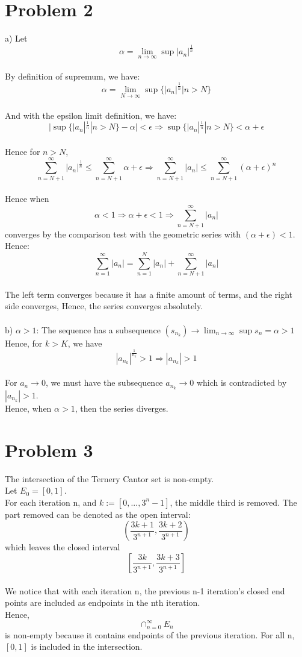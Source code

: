 \documentclass{article}
\begin{document}
\section*{Problem 2}
a) Let $$\alpha = \lim_{n \to \infty} \sup|a_n|^\frac{1}{n}$$
\\By definition of supremum, we have:$$\alpha = \lim_{N \to \infty} \sup\{|a_n|^\frac{1}{n} | n > N\}$$
\\And with the epsilon limit definition, we have: $$|\sup\{|a_n|^\frac{1}{n}|n > N \} - \alpha| < \epsilon \Rightarrow \sup\{|a_n|^\frac{1}{n}| n > N \} < \alpha + \epsilon$$
\\Hence for $n > N$, $$\sum_{n=N+1}^{\infty} |a_n|^\frac{1}{n} \leq \sum_{n=N+1}^{\infty} \alpha + \epsilon \Rightarrow \sum_{n=N+1}^{\infty} |a_n| \leq \sum_{n=N+1}^{\infty} (\alpha + \epsilon)^n$$
\\Hence when $$\alpha < 1 \Rightarrow \alpha + \epsilon < 1 \Rightarrow \sum_{n=N+1}^\infty |a_n|$$ converges by the comparison test with the geometric series with $(\alpha + \epsilon) < 1$.
\\Hence: $$\sum_{n=1}^{\infty} |a_n| = \sum_{n=1}^{N} |a_n| + \sum_{n=N+1}^{\infty} |a_n|$$
\\The left term converges because it has a finite amount of terms, and the right side converges, Hence, the series converges absolutely.
\\
\\b) $\alpha > 1$: The sequence has a subsequence $(s_{n_k}) \to \lim_{n \to \infty} \sup s_n = \alpha > 1$
\\Hence, for $k > K$, we have $$|a_{n_k}|^\frac{1}{n_k} > 1 \Rightarrow |a_{n_k}| > 1$$
\\For $a_n \to 0$, we must have the subsequence $a_{n_k} \to 0$ which is contradicted by $|a_{n_k}| > 1$.
\\Hence, when $\alpha > 1$, then the series diverges.

\section*{Problem 3}
 The intersection of the Ternery Cantor set is non-empty.
 \\Let $E_0 = [0, 1]$.
 \\For each iteration n, and $k := [0, ... ,3^n - 1] $, the middle third is removed. The part removed can be denoted as the open interval: $$(\frac{3k+1}{3^{n+1}}, \frac{3k+2}{3^{n+1}})$$ which leaves the closed interval $$[\frac{3k}{3^{n+1}}, \frac{3k+3}{3^{n+1}}]$$
 \\We notice that with each iteration n, the previous n-1 iteration's closed end points are included as endpoints in the nth iteration.
 \\Hence, $$\cap_{n=0}^{\infty} E_n$$ is non-empty because it contains endpoints of the previous iteration. For all n, $[0, 1]$ is included in the intersection.
\end{document}
